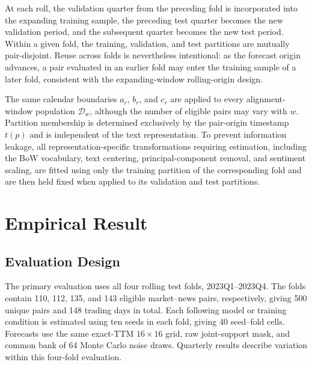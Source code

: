 At each roll, the validation quarter from the preceding fold is incorporated
into the expanding training sample, the preceding test quarter becomes the new
validation period, and the subsequent quarter becomes the new test period.
Within a given fold, the training, validation, and test partitions are mutually
pair-disjoint. Reuse across folds is nevertheless intentional: as the forecast
origin advances, a pair evaluated in an earlier fold may enter the training
sample of a later fold, consistent with the expanding-window rolling-origin
design.


The same calendar boundaries \(a_r\), \(b_r\), and \(c_r\) are applied to every
alignment-window population \(\mathcal D_w\), although the number of eligible
pairs may vary with \(w\). Partition membership is determined exclusively by
the pair-origin timestamp \(t(p)\) and is independent of the text
representation. To prevent information leakage, all representation-specific
transformations requiring estimation, including the BoW vocabulary, text
centering, principal-component removal, and sentiment scaling, are fitted
using only the training partition of the corresponding fold and are then held
fixed when applied to its validation and test partitions.




\section{Empirical Result}\label{sec: ch3: result}

\providecommand{\bootcell}[3]{%
\shortstack{#1\ensuremath{{}^{#2}}\\[-0.2ex]
{\scriptsize\ensuremath{(\widehat{\theta}/\widehat{\mathrm{SE}}_{\mathrm{boot}}=#3)}}}}
\providecommand{\bootreference}[1]{%
\shortstack{#1\\[-0.2ex]{\scriptsize (Reference)}}}



\subsection*{Evaluation Design}
The primary evaluation uses all four rolling test folds, 2023Q1--2023Q4. The folds contain 110, 112, 135, and 143 eligible market--news pairs, respectively, giving 500 unique pairs and 148 trading days in total. Each following model or training condition is estimated using ten seeds in each fold, giving 40 seed--fold cells. Forecasts use the same exact-TTM $16\times16$ grid, raw joint-support mask, and common bank of
64 Monte Carlo noise draws. Quarterly results describe variation within this four-fold evaluation. 


